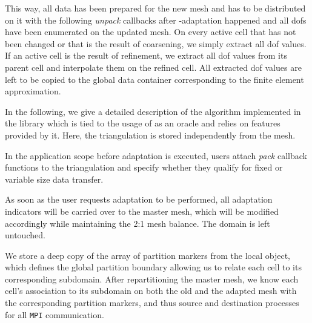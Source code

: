 This way, all data has been prepared for the new mesh and has to be distributed on it with the following \textit{unpack} callbacks after \hp-adaptation happened and all \glspl{dof} have been enumerated on the updated mesh. On every active cell that has not been changed or that is the result of coarsening, we simply extract all \gls{dof} values. If an active cell is the result of refinement, we extract all \gls{dof} values from its parent cell and interpolate them on the refined cell. All extracted \gls{dof} values are left to be copied to the global data container corresponding to the finite element approximation.

In the following, we give a detailed description of the algorithm implemented in the \dealii{} library which is tied to the usage of \pforest{} \textcite{p4est22} as an oracle and relies on features provided by it. Here, the \dealii{} triangulation is stored independently from the \pforest{} mesh.

In the application scope before adaptation is executed, users attach \textit{pack} callback functions to the triangulation and specify whether they qualify for fixed or variable size data transfer.

As soon as the user requests adaptation to be performed, all adaptation indicators will be carried over to the \pforest{} master mesh, which will be modified accordingly while maintaining the 2:1 mesh balance. The \dealii{} domain is left untouched.

We store a deep copy of the array of partition markers \parencite{burstedde2018} from the local \pforest{} object, which defines the global partition boundary allowing us to relate each cell to its corresponding subdomain. After repartitioning the \pforest{} master mesh, we know each cell's association to its subdomain on both the old and the adapted mesh with the corresponding partition markers, and thus source and destination processes for all \texttt{MPI} communication.



